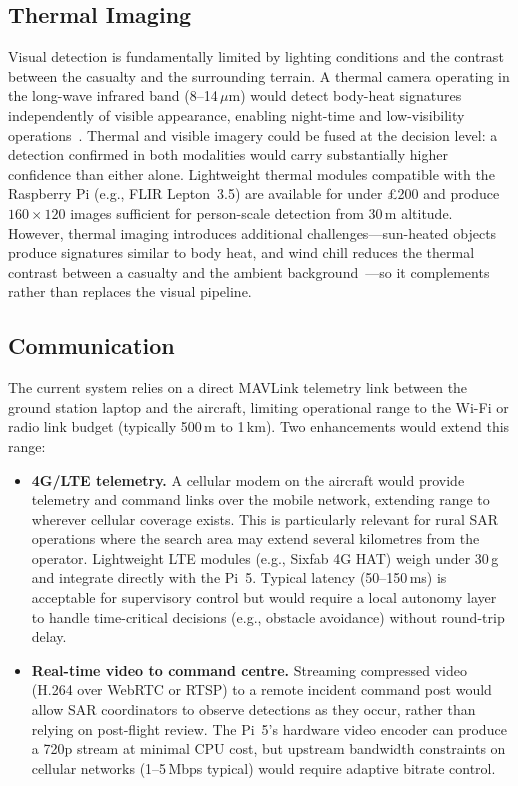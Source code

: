 \subsection{Thermal Imaging}\label{sec:future-thermal}

Visual detection is fundamentally limited by lighting conditions and the contrast between the casualty and the surrounding terrain. A thermal camera operating in the long-wave infrared band (8--14\,$\mu$m) would detect body-heat signatures independently of visible appearance, enabling night-time and low-visibility operations~\cite{rudol2008human}. Thermal and visible imagery could be fused at the decision level: a detection confirmed in both modalities would carry substantially higher confidence than either alone. Lightweight thermal modules compatible with the Raspberry Pi (e.g., FLIR Lepton~3.5) are available for under \pounds200 and produce $160\times120$ images sufficient for person-scale detection from 30\,m altitude. However, thermal imaging introduces additional challenges---sun-heated objects produce signatures similar to body heat, and wind chill reduces the thermal contrast between a casualty and the ambient background~\cite{thermal_sar}---so it complements rather than replaces the visual pipeline.

\subsection{Communication}\label{sec:future-comms}

The current system relies on a direct MAVLink telemetry link between the ground station laptop and the aircraft, limiting operational range to the Wi-Fi or radio link budget (typically 500\,m to 1\,km). Two enhancements would extend this range:

\begin{itemize}
    \item \textbf{4G/LTE telemetry.} A cellular modem on the aircraft would provide telemetry and command links over the mobile network, extending range to wherever cellular coverage exists. This is particularly relevant for rural SAR operations where the search area may extend several kilometres from the operator. Lightweight LTE modules (e.g., Sixfab 4G HAT) weigh under 30\,g and integrate directly with the Pi~5. Typical latency (50--150\,ms) is acceptable for supervisory control but would require a local autonomy layer to handle time-critical decisions (e.g., obstacle avoidance) without round-trip delay.
    \item \textbf{Real-time video to command centre.} Streaming compressed video (H.264 over WebRTC or RTSP) to a remote incident command post would allow SAR coordinators to observe detections as they occur, rather than relying on post-flight review. The Pi~5's hardware video encoder can produce a 720p stream at minimal CPU cost, but upstream bandwidth constraints on cellular networks (1--5\,Mbps typical) would require adaptive bitrate control.
\end{itemize}

